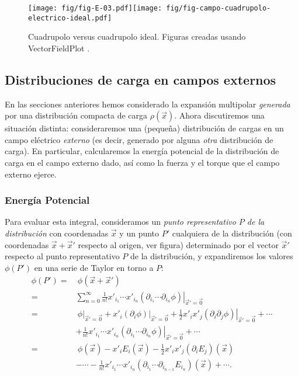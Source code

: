 \begin{figure}[H]
\begin{center}
\texttt{[image: fig/fig-E-03.pdf]}\hspace{1cm}\texttt{[image: fig/fig-campo-cuadrupolo-electrico-ideal.pdf]} 
\caption{Cuadrupolo versus cuadrupolo ideal. Figuras creadas usando VectorFieldPlot \cite{VFP}.}
\label{fig-dipolos2}
\end{center}
\end{figure}
\newpage


\subsection{Distribuciones de carga en campos externos} \label{ed3_3}

En las secciones anteriores hemos considerado la expansión multipolar
\textit{generada} por una distribución compacta de carga
$\rho(\vec{x})$. Ahora discutiremos una situación distinta: consideraremos
una (pequeña) distribución de cargas en un campo eléctrico
\textit{externo} (es decir, generado por alguna \textit{otra} distribución de
carga). En particular, calcularemos la energía potencial de la
distribución de carga en el campo externo dado, así como la fuerza y el
torque que el campo externo ejerce.

\subsubsection{Energía Potencial} \label{ed3_3_1}


Para evaluar esta integral, consideramos un \textit{punto representativo $P$ de la
distribución} con coordenadas $\vec{x}$ y un punto $P'$ cualquiera de la
distribución  (con coordenadas $\vec{x}+\vec{x}'$ respecto
al origen, ver figura) determinado por el vector $\vec{x}'$ respecto al punto
representativo $P$ de la distribución, y expandiremos los valores $\phi(P')$ en
una serie de Taylor en torno a $P$:
\begin{align} \label{eq3.3.3}
\phi(P') = &\ \phi(\vec{x}+\vec{x}')\\
= & \sum_{n=0}^\infty\frac{1}{n!}x'_{i_1}\cdots
x'_{i_n}\left.(\partial_{i_1}\cdots\partial_{i_n}\phi)\right|_{\vec{x}'=\vec{0}} \\
= &\ \left.\phi\right|_{\vec{x}'=\vec{0}}+x'_i\left.(\partial_i\phi)\right|_{\vec{
x}'=\vec{0}}+\frac{1}{2}x'_ix'_j\left.(\partial_i\partial_j\phi)\right|_{\vec{x}
'=\vec{0}}+\cdots \nonumber\\
& +\frac{1}{n!}x'_{i_1}\cdots
x'_{i_n}\left.(\partial_{i_1}\cdots\partial_{i_n}\phi)\right|_{\vec{x}'=\vec{0}}
+\cdots\\
= &\ \phi(\vec{x})-x'_iE_i(\vec{x})-\frac{1}{2}x'_ix'_j(\partial_iE_j)(\vec{x}
) \nonumber \\
& -\cdots-\frac{1}{n!}x'_{i_1}\cdots
x'_{i_n}(\partial_{i_1}\cdots\partial_{i_{n-1}}E_{i_n})(\vec{x})+\cdots .
\end{align}

